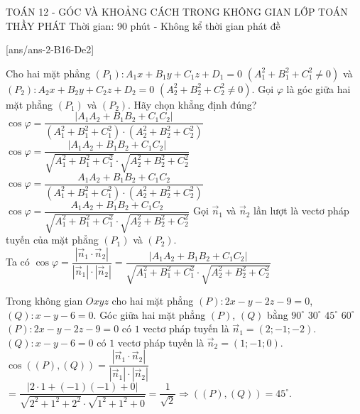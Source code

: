 \begin{name}
	{\tenchude}
	{TOÁN 12 - GÓC VÀ KHOẢNG CÁCH TRONG KHÔNG GIAN}
	{LỚP TOÁN THẦY PHÁT}
	{Thời gian: 90 phút - Không kể thời gian phát đề}
\end{name}
[ans/ans-2-B16-De2]
\caulc
\begin{ex}%
	Cho hai mặt phẳng $(P_1)\colon A_1x+B_1y+C_1z+D_1=0$ $(A_1^2+B_1^2+C_1^2\ne 0)$ và  $(P_2) \colon A_2x+B_2y+C_2z+D_2=0$ $(A_2^2+B_2^2+C_2^2\ne 0)$. Gọi $\varphi$ là góc giữa hai mặt phẳng $(P_1)$ và $(P_2)$. Hãy chọn khẳng định đúng?
	\choice
	{$\cos \varphi =\dfrac{\left|A_1A_2+B_1B_2+C_1C_2\right|}{(A_1^2+B_1^2+C_1^2)\cdot (A_2^2+B_2^2+C_2^2)}$}
	{\True $\cos \varphi =\dfrac{\left|A_1A_2+B_1B_2+C_1C_2\right|}{\sqrt{A_1^2+B_1^2+C_1^2}\cdot \sqrt{A_2^2+B_2^2+C_2^2}}$}
	{$\cos \varphi =\dfrac{A_1A_2+B_1B_2+C_1C_2}{(A_1^2+B_1^2+C_1^2)\cdot(A_2^2+B_2^2+C_2^2)}$}
	{$\cos \varphi =\dfrac{A_1A_2+B_1B_2+C_1C_2}{\sqrt{A_1^2+B_1^2+C_1^2}\cdot\sqrt{A_2^2+B_2^2+C_2^2}}$}
	\loigiai
	{
	Gọi $\overrightarrow{n}_1$ và $\overrightarrow{n}_2$ lần lượt là vectơ pháp tuyến của mặt phẳng $(P_1)$ và $(P_2)$.\\
	Ta có $\cos \varphi = \dfrac{\left|\overrightarrow{n}_1\cdot \overrightarrow{n}_2\right|}{\left|\overrightarrow{n}_1\right|\cdot \left|\overrightarrow{n}_2\right|}=\dfrac{\left|A_1A_2+B_1B_2+C_1C_2\right|}{\sqrt{A_1^2+B_1^2+C_1^2}\cdot\sqrt{A_2^2+B_2^2+C_2^2}}$
	}
\end{ex}
\begin{ex}%
	Trong không gian $Oxyz$ cho hai mặt phẳng $(P)\colon 2x - y-2z-9=0$, $(Q)\colon x - y - 6=0$. Góc giữa hai mặt phẳng $(P)$, $(Q)$ bằng
	\choice
	{$90^\circ$}
	{$30^\circ$}
	{\True $45^\circ$}
	{$60^\circ$}
	\loigiai
	{
	$(P)\colon 2x - y-2z-9=0$ có $1$ vectơ pháp tuyến là $\overrightarrow{n}_1 = (2;-1;-2)$.\\
	$(Q)\colon x - y - 6=0$ có $1$ vectơ pháp tuyến là $\overrightarrow{n}_2 = (1;-1;0)$.\\
	$\cos \left(\left( P \right),\left( Q \right)\right) = \dfrac{\left|\overrightarrow{n}_1\cdot \overrightarrow{n}_2\right|}{\left|\overrightarrow{n}_1\right|\cdot \left|\overrightarrow{n}_2\right|} $
	$= \dfrac{\left|2\cdot 1 + \left(- 1\right)\left(- 1\right) + 0\right|}{\sqrt{2^2 + 1^2 + 2^2}\cdot \sqrt{1^2+ 1^2 + 0}}= \dfrac{1}{\sqrt{2}} \Rightarrow \left(\left( P \right),\left( Q \right)\right) = 45^\circ$.
	}
\end{ex}
